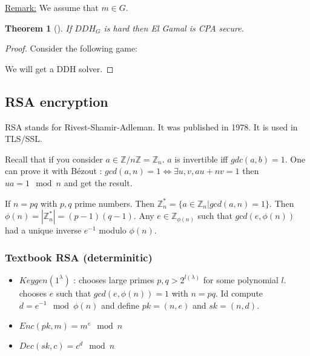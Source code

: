 \documentclass{article}
\newtheorem{thm}{Theorem}[section]
\newcommand{\Thm}[3]{\begin{thm}[#1]\label{#2}#3\end{thm}}
\newcommand{\Rem}{\underline{Remark:} }
\newcommand{\Z}{\mathbb{Z}}
\newcommand{\A}{\mathcal{A}}
\newcommand{\B}{\mathcal{B}}
\begin{document}
\Rem We assume that $m\in G$.

\Thm{}{}{If $DDH_G$ is hard then El Gamal is CPA secure.}

\begin{proof}
Consider the following game:
	
\begin{center}
\end{center}

We will get a DDH solver.
\end{proof}

\subsection{RSA encryption}
RSA stands for Rivest-Shamir-Adleman. It was published in 1978. It is used in TLS/SSL.

Recall that if you consider $a\in\Z/n\Z=\Z_n$. $a$ is invertible iff $gdc(a,b)=1$. One can prove it with Bézout : $gcd(a,n)=1\Leftrightarrow \exists u,v, au+nv=1$ then $ua = 1 \mod{n}$ and get the result.

If $n=pq$ with $p,q$ prime numbers. Then $\Z_n^* = \{a\in\Z_n|gcd(a,n)=1\}$. Then $\phi(n)=|\Z_n^*|=(p-1)(q-1)$. Any $e\in\Z_{\phi(n)}$ such that $gcd(e,\phi(n))$ had a unique inverse $e^{-1}$ modulo $\phi(n)$.

\subsubsection{Textbook RSA (determinitic)}
\begin{itemize}
\item $Keygen(1^\lambda)$ :
\subitem chooses large primes $p,q>2^{l(\lambda)}$ for some polynomial $l$.
\subitem chooses $e$ such that $gcd(e,\phi(n))=1$ with $n=pq$. Id compute $d=e^{-1}\mod{\phi(n)}$ and define $pk=(n,e)$ and $sk=(n,d)$.
\item $Enc(pk,m)=m^e\mod{n}$
\item $Dec(sk,c)=c^d\mod{n}$  
\end{itemize}
\end{document}
